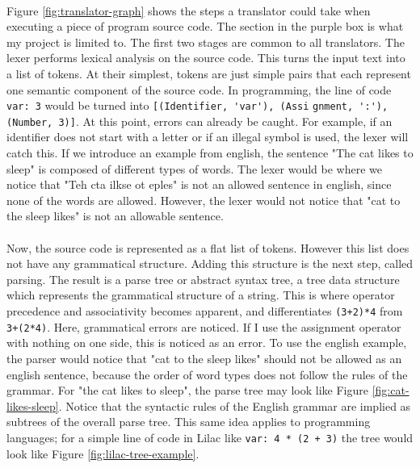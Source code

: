 \documentclass[a4paper, 11pt]{report}
\begin{document}
\\
Figure \ref{fig:translator-graph} shows the steps a translator could take when executing a piece of program source code. The section in the purple box is what my project is limited to. The first two stages are common to all translators. The lexer performs lexical analysis on the source code. This turns the input text into a list of tokens. At their simplest, tokens are just simple pairs that each represent one semantic component of the source code. In programming, the line of code \verb|var: 3| would be turned into \verb|[(Identifier, 'var'), (Assi| \verb|gnment, ':'), (Number, 3)]|. At this point, errors can already be caught. For example, if an identifier does not start with a letter or if an illegal symbol is used, the lexer will catch this. If we introduce an example from english, the sentence "The cat likes to sleep" is composed of different types of words. The lexer would be where we notice that "Teh cta ilkse ot eples" is not an allowed sentence in english, since none of the words are allowed. However, the lexer would not notice that "cat to the sleep likes" is not an allowable sentence.\\
\\
Now, the source code is represented as a flat list of tokens. However this list does not have any grammatical structure. Adding this structure is the next step, called parsing. The result is a parse tree or abstract syntax tree, a tree data structure which represents the grammatical structure of a string. This is where operator precedence and associativity becomes apparent, and differentiates \verb|(3+2)*4| from \verb|3+(2*4)|. Here, grammatical errors are noticed. If I use the assignment operator with nothing on one side, this is noticed as an error. To use the english example, the parser would notice that "cat to the sleep likes" should not be allowed as an english sentence, because the order of word types does not follow the rules of the grammar. For "the cat likes to sleep", the parse tree may look like Figure \ref{fig:cat-likes-sleep}. Notice that the syntactic rules of the English grammar are implied as subtrees of the overall parse tree. This same idea applies to programming languages; for a simple line of code in Lilac like \verb|var: 4 * (2 + 3)| the tree would look like Figure \ref{fig:lilac-tree-example}.
\\
\end{document}
